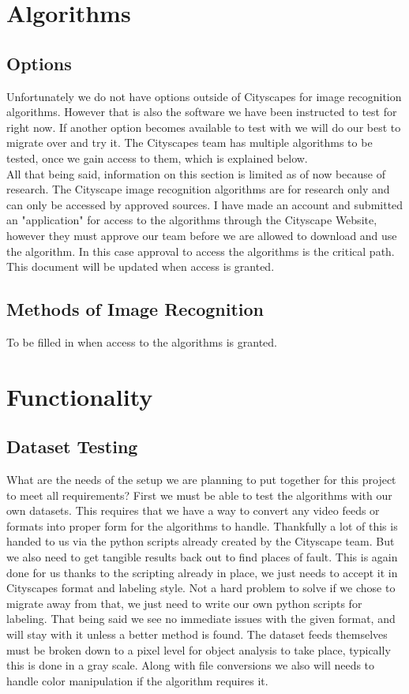 \documentclass[10pt,draftclsnofoot,onecolumn,journal,compsoc]{IEEEtran}
\begin{document}
\section{Algorithms}
    \subsection{Options}
    Unfortunately we do not have options outside of Cityscapes for image recognition algorithms. However that is also the software we have been instructed to test for right now. If another option becomes available to test with we will do our best to migrate over and try it. The Cityscapes team has multiple algorithms to be tested, once we gain access to them, which is explained below. \\
    All that being said, information on this section is limited as of now because of research. The Cityscape image recognition algorithms are for research only and can only be accessed by approved sources. I have made an account and submitted an "application" for access to the algorithms through the Cityscape Website, however they must approve our team before we are allowed to download and use the algorithm. In this case approval to access the algorithms is the critical path. This document will be updated when access is granted.
    \subsection{Methods of Image Recognition}
    To be filled in when access to the algorithms is granted. 
        
    
\section{Functionality}
	\subsection{Dataset Testing}
    What are the needs of the setup we are planning to put together for this project to meet all requirements? First we must be able to test the algorithms with our own datasets. This requires that we have a way to convert any video feeds or formats into proper form for the algorithms to handle. Thankfully a lot of this is handed to us via the python scripts already created by the Cityscape team. But we also need to get tangible results back out to find places of fault. This is again done for us thanks to the scripting already in place, we just needs to accept it in Cityscapes format and labeling style. Not a hard problem to solve if we chose to migrate away from that, we just need to write our own python scripts for labeling. That being said we see no immediate issues with the given format, and will stay with it unless a better method is found. The dataset feeds themselves must be broken down to a pixel level for object analysis to take place, typically this is done in a gray scale. Along with file conversions we also will needs to handle color manipulation if the algorithm requires it.
\end{document}
